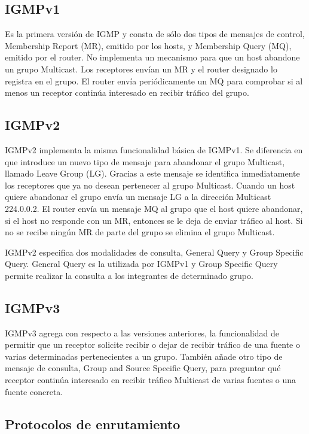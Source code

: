 \documentclass[12pt,a4paper,oneside]{book}
\begin{document}
\subsection{IGMPv1}
\label{igmpv1}

Es la primera versión de IGMP y consta de sólo dos tipos de mensajes de control, Membership Report (MR), emitido por los hosts, y Membership Query (MQ), emitido por el router. No implementa un mecanismo para que un host abandone un grupo Multicast. Los receptores envían un MR y el router designado lo registra en el grupo. El router envía periódicamente un MQ para comprobar si al menos un receptor continúa interesado en recibir tráfico del grupo. 

\subsection{IGMPv2}
\label{igmpv2}

IGMPv2 implementa la misma funcionalidad básica de IGMPv1. Se diferencia en que introduce un nuevo tipo de mensaje para abandonar el grupo Multicast, llamado Leave Group (LG). Gracias a este mensaje se identifica inmediatamente los receptores que ya no desean pertenecer al grupo Multicast. Cuando un host quiere abandonar el grupo envía un mensaje LG a la dirección Multicast 224.0.0.2. El router envía un mensaje MQ al grupo que el host quiere abandonar, si el host no responde con un MR, entonces se le deja de enviar tráfico al host. Si no se recibe ningún MR de parte del grupo se elimina el grupo Multicast.

IGMPv2 especifica dos modalidades de consulta, General Query y Group Specific Query. General Query es la utilizada por IGMPv1 y Group Specific Query permite realizar la consulta a los integrantes de determinado grupo.


\subsection{IGMPv3}
\label{igmpv3}

IGMPv3 agrega con respecto a las versiones anteriores, la funcionalidad de permitir que un receptor solicite recibir o dejar de recibir tráfico de una fuente o varias determinadas pertenecientes a un grupo. También añade otro tipo de mensaje de consulta, Group and Source Specific Query, para preguntar qué receptor continúa interesado en recibir tráfico Multicast de varias fuentes o una fuente concreta.

\subsection{Protocolos de enrutamiento}
\end{document}
